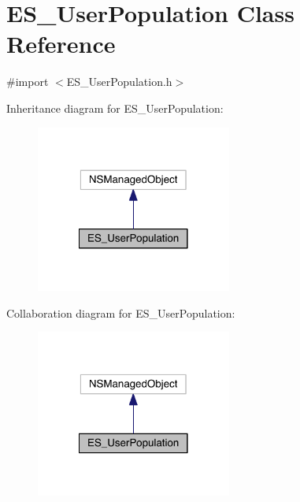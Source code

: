 \hypertarget{interface_e_s___user_population}{\section{E\+S\+\_\+\+User\+Population Class Reference}
\label{interface_e_s___user_population}
}


{\ttfamily \#import $<$E\+S\+\_\+\+User\+Population.\+h$>$}



Inheritance diagram for E\+S\+\_\+\+User\+Population\+:\nopagebreak
\begin{figure}[H]
\begin{center}
\leavevmode
\includegraphics[width=182pt]{de/dbb/interface_e_s___user_population__inherit__graph}
\end{center}
\end{figure}


Collaboration diagram for E\+S\+\_\+\+User\+Population\+:\nopagebreak
\begin{figure}[H]
\begin{center}
\leavevmode
\includegraphics[width=182pt]{dd/da7/interface_e_s___user_population__coll__graph}
\end{center}
\end{figure}
